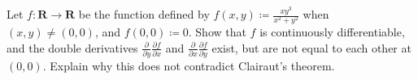 \exercisesection

\begin{exercise}\label{ex 6.5.1}
    Let \(f : \mathbf{R} \to \mathbf{R}\) be the function defined by \(f(x, y) \coloneqq \frac{x y^3}{x^2 + y^2}\) when \((x, y) \neq (0, 0)\), and \(f(0, 0) \coloneqq 0\).
    Show that \(f\) is continuously differentiable, and the double derivatives \(\frac{\partial}{\partial y} \frac{\partial f}{\partial x}\) and \(\frac{\partial}{\partial x} \frac{\partial f}{\partial y}\) exist, but are not equal to each other at \((0, 0)\).
    Explain why this does not contradict Clairaut's theorem.
\end{exercise}